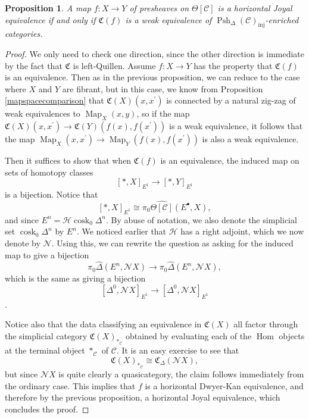 \documentclass[leqno]{article}
\numberwithin{equation}{subsection}
\theoremstyle{plain}   %
\newtheorem{prop}[equation]{Proposition}
\theoremstyle{remark}
\theoremstyle{plain}
\DeclareMathOperator{\Psh}{Psh}
\DeclareMathOperator{\Map}{Map}
\DeclareMathOperator{\Hom}{Hom}
\newcommand{\psh}[1]{\ensuremath{\widehat{#1}}}
\newcommand{\C}{\ensuremath{\mathcal{C}}}
\newcommand{\cellset}{\ensuremath{\widehat{\Theta[\mathcal{C}]}}}
\begin{document}
\begin{prop}\label{conservativity}
	A map \(f:X\to Y\) of presheaves on \(\Theta[\C]\) is a horizontal Joyal equivalence if and only if \(\mathfrak{C}(f)\) is a weak equivalence of \(\Psh_\Delta (\C)_{\mathrm{inj}}\)-enriched categories.
\end{prop}
\begin{proof}
	We only need to check one direction, since the other direction is immediate by the fact that \(\mathfrak{C}\) is left-Quillen.  Assume \(f:X\to Y\) has the property that \(\mathfrak{C}(f)\) is an equivalence. Then as in the previous proposition, we can reduce to the case where \(X\) and \(Y\) are fibrant, but in this case, we know from Proposition \ref{mapspacecomparison} that \(\mathfrak{C}(X)(x,x^\prime)\) is connected by a natural zig-zag of weak equivalences to \(\Map_X(x,y)\), so if the map  \(\mathfrak{C}(X)(x,x^\prime)\to \mathfrak{C}(Y)(f(x),f(x^\prime))\) is a weak equivalence, it follows that the map \(\Map_X(x,x^\prime)\to \Map_Y(f(x),f(x^\prime))\) is also a weak equivalence.

	Then it suffices to show that when \(\mathfrak{C}(f)\) is an equivalence, the induced map on sets of homotopy classes
	\[[\ast,X]_{E^1} \to [\ast,Y]_{E^1}\]
	is a bijection.  Notice that
	\[[\ast,X]_{E^1} \cong \pi_0 \cellset(E^\bullet,X),\]
	and since \(E^n=\mathscr{H}\operatorname{cosk}_0 \Delta^n\). By abuse of notation, we also denote the simplicial set \(\operatorname{cosk}_0 \Delta^n\) by \(E^n\).  We noticed earlier that \(\mathscr{H}\) has a right adjoint, which we now denote by \(\mathscr{N}\). Using this, we can rewrite the question as asking for the induced map to give a bijection
	\[\pi_0 \psh{\Delta}(E^n,\mathscr{N}X) \to \pi_0 \psh{\Delta}(E^n,\mathscr{N}X),\]
	which is the same as giving a bijection
	\[[\Delta^0,\mathscr{N}X]_{E^1}\to [\Delta^0,\mathscr{N}X]_{E^1}\].

	Notice also that the data classifying an equivalence in \(\mathfrak{C}(X)\) all factor through the simplicial category \(\mathfrak{C}(X)_{\ast_\C}\) obtained by evaluating each of the \(\Hom\) objects at the terminal object \(\ast_{\C}\) of \(\C\).  It is an easy exercise to see that
	\[\mathfrak{C}(X)_{\ast_\C} \cong \mathfrak{C}_\Delta (\mathscr{N}X),\]
	but since \(\mathscr{N}X\) is quite clearly a quasicategory, the claim follows immediately from the ordinary case.  This implies that \(f\) is a horizontal Dwyer-Kan equivalence, and therefore by the previous proposition, a horizontal Joyal equivalence, which concludes the proof.
\end{proof}
\end{document}
